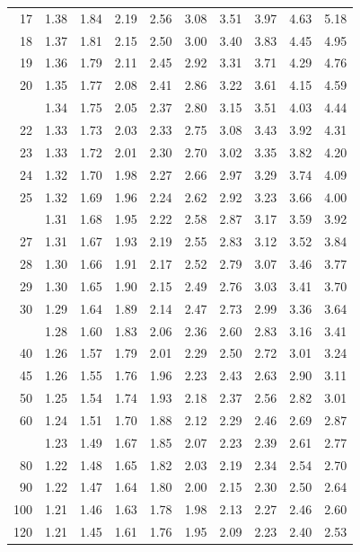 \documentclass[10pt]{article}
\begin{document}
\begin{longtable}{@{}r!{\vrule width 0.8pt\hspace{0.55em}}rrrrrrrrr@{}}
17 & 1.38 & 1.84 & 2.19 & 2.56 & 3.08 & 3.51 & 3.97 & 4.63 & 5.18 \\
18 & 1.37 & 1.81 & 2.15 & 2.50 & 3.00 & 3.40 & 3.83 & 4.45 & 4.95 \\
19 & 1.36 & 1.79 & 2.11 & 2.45 & 2.92 & 3.31 & 3.71 & 4.29 & 4.76 \\
20 & 1.35 & 1.77 & 2.08 & 2.41 & 2.86 & 3.22 & 3.61 & 4.15 & 4.59 \\
 & 1.34 & 1.75 & 2.05 & 2.37 & 2.80 & 3.15 & 3.51 & 4.03 & 4.44 \\
22 & 1.33 & 1.73 & 2.03 & 2.33 & 2.75 & 3.08 & 3.43 & 3.92 & 4.31 \\
23 & 1.33 & 1.72 & 2.01 & 2.30 & 2.70 & 3.02 & 3.35 & 3.82 & 4.20 \\
24 & 1.32 & 1.70 & 1.98 & 2.27 & 2.66 & 2.97 & 3.29 & 3.74 & 4.09 \\
25 & 1.32 & 1.69 & 1.96 & 2.24 & 2.62 & 2.92 & 3.23 & 3.66 & 4.00 \\
 & 1.31 & 1.68 & 1.95 & 2.22 & 2.58 & 2.87 & 3.17 & 3.59 & 3.92 \\
27 & 1.31 & 1.67 & 1.93 & 2.19 & 2.55 & 2.83 & 3.12 & 3.52 & 3.84 \\
28 & 1.30 & 1.66 & 1.91 & 2.17 & 2.52 & 2.79 & 3.07 & 3.46 & 3.77 \\
29 & 1.30 & 1.65 & 1.90 & 2.15 & 2.49 & 2.76 & 3.03 & 3.41 & 3.70 \\
30 & 1.29 & 1.64 & 1.89 & 2.14 & 2.47 & 2.73 & 2.99 & 3.36 & 3.64 \\
 & 1.28 & 1.60 & 1.83 & 2.06 & 2.36 & 2.60 & 2.83 & 3.16 & 3.41 \\
40 & 1.26 & 1.57 & 1.79 & 2.01 & 2.29 & 2.50 & 2.72 & 3.01 & 3.24 \\
45 & 1.26 & 1.55 & 1.76 & 1.96 & 2.23 & 2.43 & 2.63 & 2.90 & 3.11 \\
50 & 1.25 & 1.54 & 1.74 & 1.93 & 2.18 & 2.37 & 2.56 & 2.82 & 3.01 \\
60 & 1.24 & 1.51 & 1.70 & 1.88 & 2.12 & 2.29 & 2.46 & 2.69 & 2.87 \\
 & 1.23 & 1.49 & 1.67 & 1.85 & 2.07 & 2.23 & 2.39 & 2.61 & 2.77 \\
80 & 1.22 & 1.48 & 1.65 & 1.82 & 2.03 & 2.19 & 2.34 & 2.54 & 2.70 \\
90 & 1.22 & 1.47 & 1.64 & 1.80 & 2.00 & 2.15 & 2.30 & 2.50 & 2.64 \\
100 & 1.21 & 1.46 & 1.63 & 1.78 & 1.98 & 2.13 & 2.27 & 2.46 & 2.60 \\
120 & 1.21 & 1.45 & 1.61 & 1.76 & 1.95 & 2.09 & 2.23 & 2.40 & 2.53 \\

\end{longtable}
\end{document}
